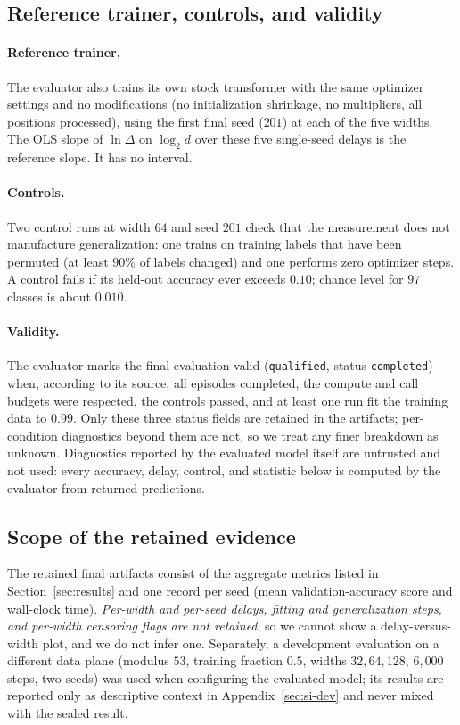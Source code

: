 \documentclass{article}
\begin{document}
\subsection{Reference trainer, controls, and validity}
\label{sec:controls}
\paragraph{Reference trainer.} The evaluator also trains its own stock transformer with the same optimizer settings and no modifications (no initialization shrinkage, no multipliers, all positions processed), using the first final seed ($201$) at each of the five widths. The OLS slope of $\ln\Delta$ on $\log_2 d$ over these five single-seed delays is the reference slope. It has no interval.

\paragraph{Controls.} Two control runs at width $64$ and seed $201$ check that the measurement does not manufacture generalization: one trains on training labels that have been permuted (at least $90\%$ of labels changed) and one performs zero optimizer steps. A control fails if its held-out accuracy ever exceeds $0.10$; chance level for $97$ classes is about $0.010$.

\paragraph{Validity.} The evaluator marks the final evaluation valid (\texttt{qualified}, status \texttt{completed}) when, according to its source, all episodes completed, the compute and call budgets were respected, the controls passed, and at least one run fit the training data to $0.99$. Only these three status fields are retained in the artifacts; per-condition diagnostics beyond them are not, so we treat any finer breakdown as unknown. Diagnostics reported by the evaluated model itself are untrusted and not used: every accuracy, delay, control, and statistic below is computed by the evaluator from returned predictions.

\subsection{Scope of the retained evidence}
\label{sec:scope}
The retained final artifacts consist of the aggregate metrics listed in Section~\ref{sec:results} and one record per seed (mean validation-accuracy score and wall-clock time). \emph{Per-width and per-seed delays, fitting and generalization steps, and per-width censoring flags are not retained}, so we cannot show a delay-versus-width plot, and we do not infer one. Separately, a development evaluation on a different data plane (modulus $53$, training fraction $0.5$, widths $32,64,128$, $6{,}000$ steps, two seeds) was used when configuring the evaluated model; its results are reported only as descriptive context in Appendix~\ref{sec:si-dev} and never mixed with the sealed result.
\end{document}
